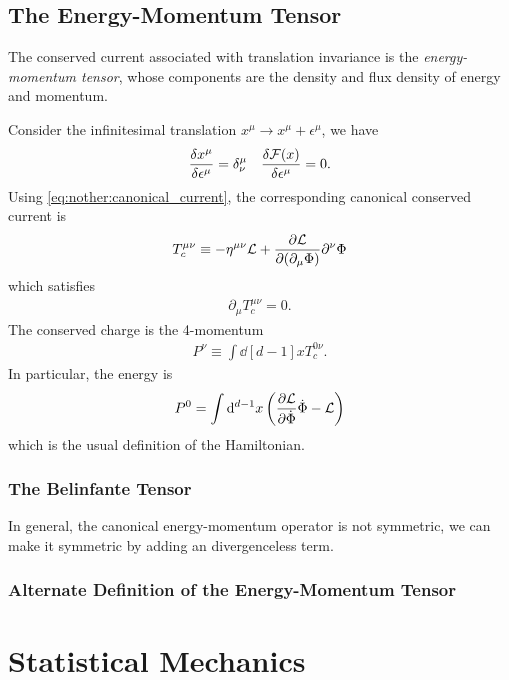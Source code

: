\documentclass[10pt]{article}
\begin{document}
\subsection{The Energy-Momentum Tensor}
The conserved current associated with translation invariance is the \textit{energy-momentum tensor}, whose components are the density and flux density of energy and momentum.

Consider the infinitesimal translation $x^\mu\to x^\mu+\epsilon^\mu$, we have 
\begin{align}
    \fdv{x^\mu}{\epsilon^\mu}=\delta^\mu_\nu\quad\fdv{\mathcal{F}(x)}{\epsilon^\mu}=0.
\end{align}
Using \cref{eq:nother:canonical_current}, the corresponding canonical conserved current is 
\begin{align}
    T^{\mu\nu}_c\equiv-\eta^{\mu\nu}\mathcal{L}+\pdv{\mathcal{L}}{(\partial_\mu\Phi)}\partial^\nu\Phi
\end{align}
which satisfies 
\begin{align}
    \partial_\mu T^{\mu\nu}_c=0.
\end{align}
The conserved charge is the 4-momentum 
\begin{align}
    P^\nu\equiv\int\dd[d-1]{x}T^{0\nu}_c.
\end{align}
In particular, the energy is 
\begin{align}
    P^0=\int\dd[d-1]{x}\left(\pdv{\mathcal{L}}{\dot{\Phi}}\dot{\Phi}-\mathcal{L}\right)
\end{align}
which is the usual definition of the Hamiltonian.

\subsubsection{The Belinfante Tensor}
\begin{intu}
    In general, the canonical energy-momentum operator is not symmetric, we can make it symmetric by adding an divergenceless term.
\end{intu}

\subsubsection{Alternate Definition of the Energy-Momentum Tensor}

\clearpage
\section{Statistical Mechanics}
\end{document}

